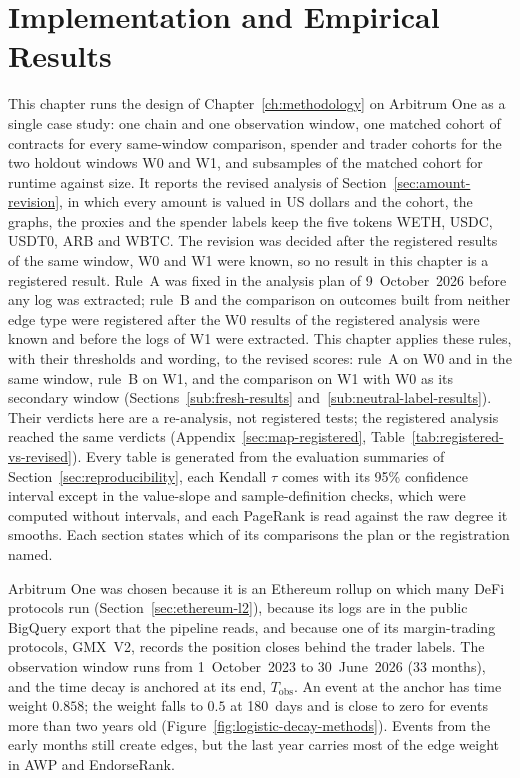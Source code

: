 \chapter{Implementation and Empirical Results}
\label{ch:results}

This chapter runs the design of Chapter~\ref{ch:methodology} on Arbitrum One as a single case study: one chain and one observation window, one matched cohort of contracts for every same-window comparison, spender and trader cohorts for the two holdout windows W0 and W1, and subsamples of the matched cohort for runtime against size. It reports the revised analysis of Section~\ref{sec:amount-revision}, in which every amount is valued in US dollars and the cohort, the graphs, the proxies and the spender labels keep the five tokens WETH, USDC, USDT0, ARB and WBTC. The revision was decided after the registered results of the same window, W0 and W1 were known, so no result in this chapter is a registered result. Rule~A was fixed in the analysis plan of 9~October~2026 before any log was extracted; rule~B and the comparison on outcomes built from neither edge type were registered after the W0 results of the registered analysis were known and before the logs of W1 were extracted. This chapter applies these rules, with their thresholds and wording, to the revised scores: rule~A on W0 and in the same window, rule~B on W1, and the comparison on W1 with W0 as its secondary window (Sections~\ref{sub:fresh-results} and~\ref{sub:neutral-label-results}). Their verdicts here are a re-analysis, not registered tests; the registered analysis reached the same verdicts (Appendix~\ref{sec:map-registered}, Table~\ref{tab:registered-vs-revised}). Every table is generated from the evaluation summaries of Section~\ref{sec:reproducibility}, each Kendall $\tau$ comes with its 95\% confidence interval except in the value-slope and sample-definition checks, which were computed without intervals, and each PageRank is read against the raw degree it smooths. Each section states which of its comparisons the plan or the registration named.


Arbitrum One was chosen because it is an Ethereum rollup on which many DeFi protocols run (Section~\ref{sec:ethereum-l2}), because its logs are in the public BigQuery export that the pipeline reads, and because one of its margin-trading protocols, GMX~V2, records the position closes behind the trader labels. The observation window runs from 1~October~2023 to 30~June~2026 (33 months), and the time decay is anchored at its end, $T_{\mathrm{obs}}$. An event at the anchor has time weight $0.858$; the weight falls to $0.5$ at 180~days and is close to zero for events more than two years old (Figure~\ref{fig:logistic-decay-methods}). Events from the early months still create edges, but the last year carries most of the edge weight in AWP and EndorseRank.

